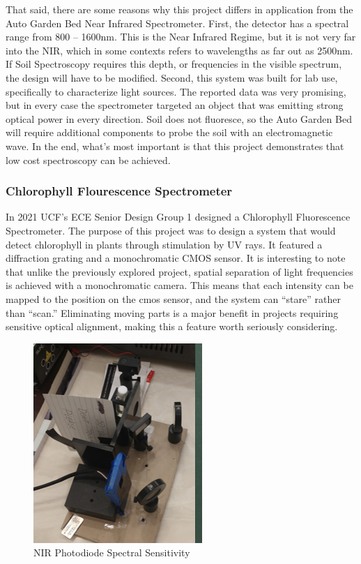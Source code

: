 That said, there are some reasons why this project differs in application from the Auto Garden Bed Near Infrared Spectrometer. First, the detector has a spectral range from 800 – 1600nm. This is the Near Infrared Regime, but it is not very far into the NIR, which in some contexts refers to wavelengths as far out as 2500nm. If Soil Spectroscopy requires this depth, or frequencies in the visible spectrum, the design will have to be modified. Second, this system was built for lab use, specifically to characterize light sources. The reported data was very promising, but in every case the spectrometer targeted an object that was emitting strong optical power in every direction. Soil does not fluoresce, so the Auto Garden Bed will require additional components to probe the soil with an electromagnetic wave. In the end, what’s most important is that this project demonstrates that low cost spectroscopy can be achieved.


\subsubsection{Chlorophyll Flourescence Spectrometer}



In 2021 UCF’s ECE Senior Design Group 1 designed a Chlorophyll Fluorescence Spectrometer. The purpose of this project was to design a system that would detect chlorophyll in plants through stimulation by UV rays. It featured a diffraction grating and a monochromatic CMOS sensor. It is interesting to note that unlike the previously explored project, spatial separation of light frequencies is achieved with a monochromatic camera. This means that each intensity can be mapped to the position on the cmos sensor, and the system can “stare” rather than “scan.” Eliminating moving parts is a major benefit in projects requiring sensitive optical alignment, making this a feature worth seriously considering.

\begin{figure}[H]
    \caption{NIR Photodiode Spectral Sensitivity}
    \centering
    \includegraphics[width=.6\textwidth]{images/3.1.2Pic.png}
\end{figure}

